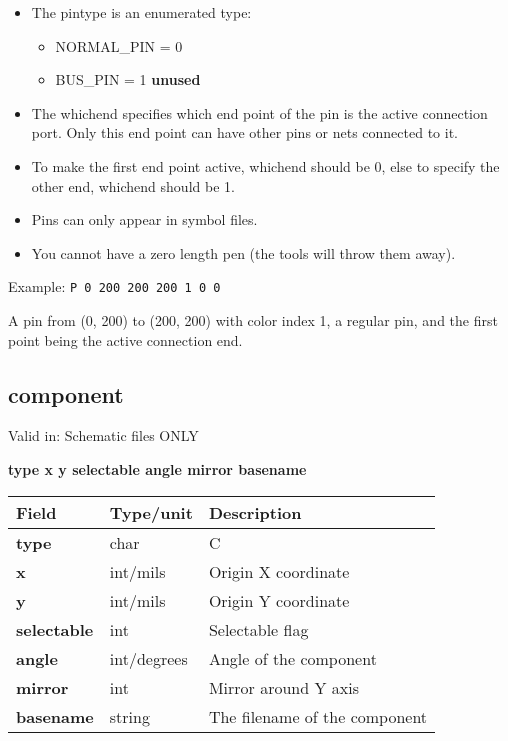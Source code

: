 \documentclass{article}
\begin{document}
\begin{itemize}
\item The pintype is an enumerated type:
\begin{itemize}
\item NORMAL\_PIN = 0
\item BUS\_PIN = 1 {\bf unused}
\end{itemize}
\item The whichend specifies which end point of the pin is the active 
      connection port.  Only this end point can have other pins or nets 
      connected to it.
\item To make the first end point active, whichend should be 0, else to
      specify the other end, whichend should be 1.
\item Pins can only appear in symbol files.
\item You cannot have a zero length pen (the tools will throw them away).
\end{itemize}

Example:\newline
{\tt P 0 200 200 200 1 0 0}

A pin from (0, 200) to (200, 200) with color index 1, a regular pin, and the
first point being the active connection end.


\subsection{component}

Valid in: Schematic files ONLY

{\bf type x y selectable angle mirror basename}

\begin{table}[h]
\begin{tabular}{|l|l|l|} \hline
Field 		& Type/unit 	& Description \\ \hline 
\hline
{\bf type} 	& char 		& C \\ \hline
{\bf x} 	& int/mils	& Origin X coordinate \\ \hline
{\bf y} 	& int/mils	& Origin Y coordinate \\ \hline
{\bf selectable}& int		& Selectable flag \\ \hline
{\bf angle} 	& int/degrees	& Angle of the component \\ \hline
{\bf mirror} 	& int 		& Mirror around Y axis \\ \hline
{\bf basename}  & string	& The filename of the component \\ \hline
\end{tabular}
\end{table}
\end{document}
